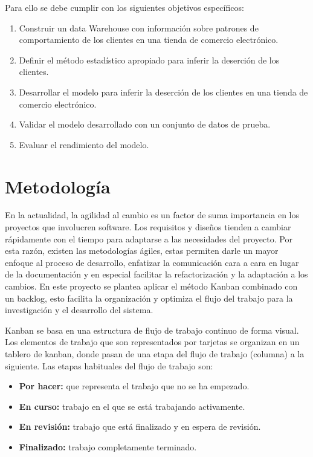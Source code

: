 Para ello se debe cumplir con los siguientes objetivos específicos:


\begin{enumerate}
	\item Construir un data Warehouse con información sobre patrones de comportamiento de los clientes en una tienda de comercio electrónico.
	\item Definir el método estadístico apropiado para inferir la deserción de los clientes.
	\item Desarrollar el modelo para inferir la deserción de los clientes en una tienda de comercio electrónico.
	\item Validar el modelo desarrollado con un conjunto de datos de prueba.
	\item Evaluar el rendimiento del modelo.
\end{enumerate}

\section{Metodología}


	En la actualidad, la agilidad al cambio es un factor de suma importancia en los proyectos que involucren software. Los requisitos y diseños tienden a cambiar rápidamente con el tiempo para adaptarse a las necesidades del proyecto. Por esta razón, existen las metodologías ágiles, estas permiten darle un mayor enfoque al proceso de desarrollo, enfatizar la comunicación cara a cara en lugar de la documentación y en especial facilitar la refactorización y la adaptación a los cambios. En este proyecto se plantea aplicar el método Kanban combinado con un backlog, esto facilita la organización y optimiza el flujo del trabajo para la investigación y el desarrollo del sistema. 


	Kanban se basa en una estructura de flujo de trabajo continuo de forma visual. Los elementos de trabajo que son representados por tarjetas se organizan en un tablero de kanban, donde pasan de una etapa del flujo de trabajo (columna) a la siguiente. Las etapas habituales del flujo de trabajo son:


\begin{itemize}
	\item \textbf{Por hacer:} que representa el trabajo que no se ha empezado.
	\item \textbf{En curso:} trabajo en el que se está trabajando activamente.
	\item \textbf{En revisión:} trabajo que está finalizado y en espera de revisión.
	\item \textbf{Finalizado:} trabajo completamente terminado.
\end{itemize}


